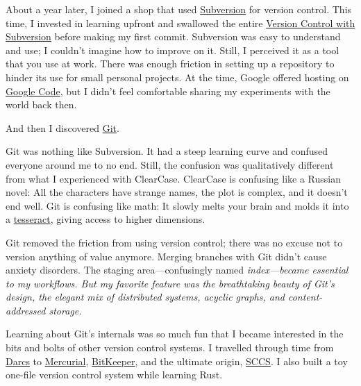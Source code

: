 \documentclass{article}
\begin{document}
About a year later, I joined a shop that used \href{https://subversion.apache.org/}{Subversion} for version control.
This time, I invested in learning upfront and swallowed the entire \href{https://svnbook.red-bean.com/}{Version Control with Subversion} before making my first commit.
Subversion was easy to understand and use; I couldn't imagine how to improve on it.
Still, I perceived it as a tool that you use at work.
There was enough friction in setting up a repository to hinder its use for small personal projects.
At the time, Google offered hosting on \href{https://code.google.com/}{Google Code}, but I didn't feel comfortable sharing my experiments with the world back then.

And then I discovered \href{https://git-scm.com/}{Git}.

Git was nothing like Subversion.
It had a steep learning curve and confused everyone around me to no end.
Still, the confusion was qualitatively different from what I experienced with ClearCase.
ClearCase is confusing like a Russian novel: All the characters have strange names, the plot is complex, and it doesn't end well.
Git is confusing like math: It slowly melts your brain and molds it into a \href{https://en.wikipedia.org/wiki/Tesseract}{tesseract}, giving access to higher dimensions.

Git removed the friction from using version control; there was no excuse not to version anything of value anymore.
Merging branches with Git didn't cause anxiety disorders.
The staging area---confusingly named \em{index}---became essential to my workflows.
But my favorite feature was the breathtaking beauty of Git's design, the elegant mix of distributed systems, acyclic graphs, and content-addressed storage.

Learning about Git's internals was so much fun that I became interested in the bits and bolts of other version control systems.
I travelled through time from \href{https://darcs.net/}{Darcs} to \href{https://www.mercurial-scm.org/}{Mercurial}, \href{https://www.bitkeeper.org/}{BitKeeper}, and the ultimate origin, \href{https://en.wikipedia.org/wiki/Source_Code_Control_System}{SCCS}.
I also built a toy one-file version control system while learning Rust.
\end{document}
